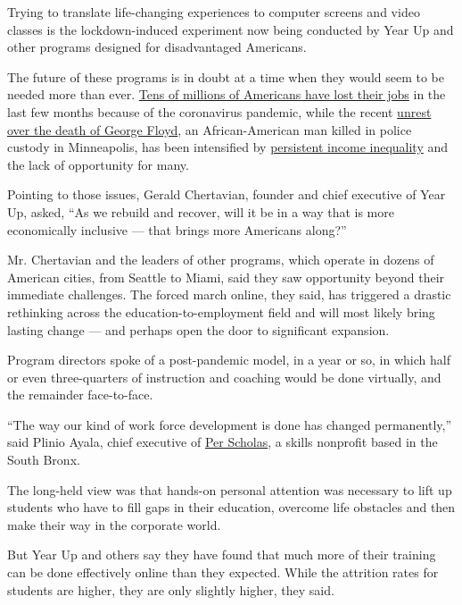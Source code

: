 Trying to translate life-changing experiences to computer screens and
video classes is the lockdown-induced experiment now being conducted by
Year Up and other programs designed for disadvantaged Americans.

The future of these programs is in doubt at a time when they would seem
to be needed more than ever.
\href{https://www.nytimes.com/2020/06/04/business/economy/coronavirus-unemployment-claims.html}{Tens
of millions of Americans have lost their jobs} in the last few months
because of the coronavirus pandemic, while the recent
\href{https://www.nytimes.com/news-event/george-floyd-protests-minneapolis-new-york-los-angeles?action=click\&pgtype=Article\&state=default\&module=styln-george-floyd\&variant=show\&region=TOP_BANNER\&context=storylines_menu}{unrest
over the death of George Floyd}, an African-American man killed in
police custody in Minneapolis, has been intensified by
\href{https://www.nytimes.com/interactive/2020/06/11/multimedia/coronavirus-new-york-inequality.html}{persistent
income inequality} and the lack of opportunity for many.

Pointing to those issues, Gerald Chertavian, founder and chief executive
of Year Up, asked, ``As we rebuild and recover, will it be in a way that
is more economically inclusive --- that brings more Americans along?''

Mr. Chertavian and the leaders of other programs, which operate in
dozens of American cities, from Seattle to Miami, said they saw
opportunity beyond their immediate challenges. The forced march online,
they said, has triggered a drastic rethinking across the
education-to-employment field and will most likely bring lasting change
--- and perhaps open the door to significant expansion.

Program directors spoke of a post-pandemic model, in a year or so, in
which half or even three-quarters of instruction and coaching would be
done virtually, and the remainder face-to-face.

``The way our kind of work force development is done has changed
permanently,'' said Plinio Ayala, chief executive of
\href{https://perscholas.org/}{Per Scholas}, a skills nonprofit based in
the South Bronx.

The long-held view was that hands-on personal attention was necessary to
lift up students who have to fill gaps in their education, overcome life
obstacles and then make their way in the corporate world.

But Year Up and others say they have found that much more of their
training can be done effectively online than they expected. While the
attrition rates for students are higher, they are only slightly higher,
they said.

